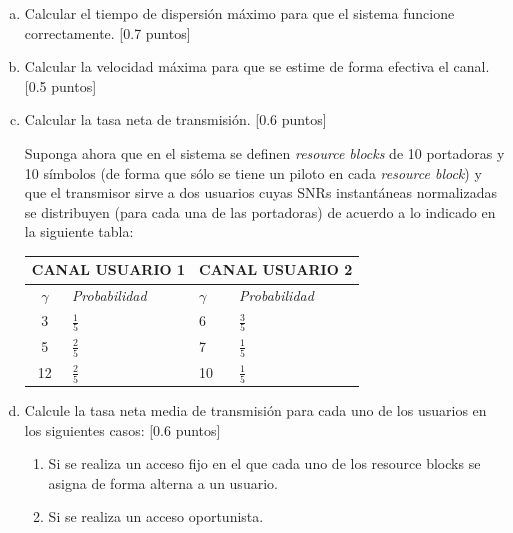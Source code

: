 \documentclass[fleqn,14pt]{article}
\begin{document}
\begin{enumerate}[a)]
  \item Calcular el tiempo de dispersión máximo para que el sistema funcione correctamente. [0.7 puntos]
  \item Calcular la velocidad máxima para que se estime de forma efectiva el canal. [0.5 puntos]
  \item Calcular la tasa neta de transmisión. [0.6 puntos]


  Suponga ahora que en el sistema se definen \textit{resource blocks} de 10 portadoras y 10 símbolos (de forma que sólo se tiene un piloto en cada \textit{resource block}) y que el transmisor sirve a dos usuarios cuyas SNRs instantáneas normalizadas se distribuyen (para cada una de las portadoras) de acuerdo a lo indicado en la siguiente tabla:
  \newline
  \newline
    \begin{table}[ht]
      \centering
      \begin{tabular}{@{}|c|l|l|l|@{}}
      \toprule
      \multicolumn{2}{|c|}{\textbf{CANAL USUARIO 1}} & \multicolumn{2}{l|}{\textbf{CANAL USUARIO 2}} \\ \midrule
      $\gamma$ & \textit{Probabilidad} & $\gamma$   & \textit{Probabilidad}         \\ \midrule
      3        & $\frac{1}{5}$           & 6          & $\frac{3}{5}$               \\ \midrule
      5        & $\frac{2}{5}$           & 7          & $\frac{1}{5}$               \\ \midrule
      12       & $\frac{2}{5}$           & 10         & $\frac{1}{5}$               \\ \midrule
      \end{tabular}
    \end{table}

  \item Calcule la tasa neta media de transmisión para cada uno de los usuarios en los siguientes casos: [0.6 puntos]
  \begin{enumerate}[1.]
    \item Si se realiza un acceso fijo en el que cada uno de los resource blocks se asigna de forma alterna a un usuario.
    \item Si se realiza un acceso oportunista.
  \end{enumerate}
\end{enumerate}
\end{document}
